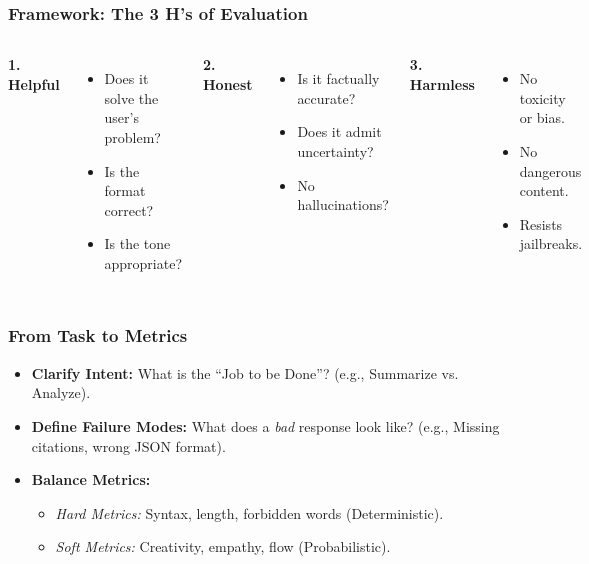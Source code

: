 \documentclass{beamer}
\begin{document}
\begin{frame}
    \frametitle{Framework: The 3 H's of Evaluation}
    \begin{columns}[T]
        \textbf{1. Helpful}
        \begin{itemize}
            \item Does it solve the user's problem?
            \item Is the format correct?
            \item Is the tone appropriate?
        \end{itemize}
        
        \textbf{2. Honest}
        \begin{itemize}
            \item Is it factually accurate?
            \item Does it admit uncertainty?
            \item No hallucinations?
        \end{itemize}
        
        \textbf{3. Harmless}
        \begin{itemize}
            \item No toxicity or bias.
            \item No dangerous content.
            \item Resists jailbreaks.
        \end{itemize}
    \end{columns}
\end{frame}

\begin{frame}
    \frametitle{From Task to Metrics}
    \begin{itemize}
        \item \textbf{Clarify Intent:} What is the ``Job to be Done''? (e.g., Summarize vs. Analyze).
        \item \textbf{Define Failure Modes:} What does a \textit{bad} response look like? (e.g., Missing citations, wrong JSON format).
        \item \textbf{Balance Metrics:}
        \begin{itemize}
            \item \textit{Hard Metrics:} Syntax, length, forbidden words (Deterministic).
            \item \textit{Soft Metrics:} Creativity, empathy, flow (Probabilistic).
        \end{itemize}
    \end{itemize}
\end{frame}
\end{document}
